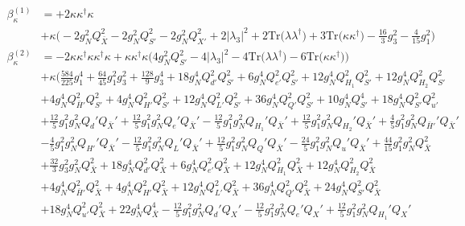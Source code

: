{\begin{align}
\beta_{\kappa}^{(1)} & =  
+2 {\kappa  \kappa^{\dagger}  \kappa} \nonumber \\ 
 &+\kappa \Big(-2 g_{N}^{2} Q_{\bar{X}}^{2}  -2 g_{N}^{2} Q_{S'}^{2}  -2 g_{N}^{2} Q_{X'}^{2}  + 2 |\lambda_3|^2  + 2 \mbox{Tr}\Big({\lambda  \lambda^{\dagger}}\Big)  + 3 \mbox{Tr}\Big({\kappa  \kappa^{\dagger}}\Big)  -\frac{16}{3} g_{3}^{2}  -\frac{4}{15} g_{1}^{2} \Big)\\ 
\beta_{\kappa}^{(2)} & =  
-2 {\kappa  \kappa^{\dagger}  \kappa  \kappa^{\dagger}  \kappa} +{\kappa  \kappa^{\dagger}  \kappa} \Big(4 g_{N}^{2} Q_{S'}^{2}  -4 |\lambda_3|^2  -4 \mbox{Tr}\Big({\lambda  \lambda^{\dagger}}\Big)  -6 \mbox{Tr}\Big({\kappa  \kappa^{\dagger}}\Big) \Big)\nonumber \\ 
 &+\kappa \Big(\frac{584}{225} g_{1}^{4} +\frac{64}{45} g_{1}^{2} g_{3}^{2} +\frac{128}{9} g_{3}^{4} +18 g_{N}^{4} Q_{d'}^{2} Q_{S'}^{2} +6 g_{N}^{4} Q_{e'}^{2} Q_{S'}^{2} +12 g_{N}^{4} Q_{H_1}^{2} Q_{S'}^{2} +12 g_{N}^{4} Q_{H_2}^{2} Q_{S'}^{2} \nonumber \\ 
 &+4 g_{N}^{4} Q_{\bar{H}'}^{2} Q_{S'}^{2} +4 g_{N}^{4} Q_{H'}^{2} Q_{S'}^{2} +12 g_{N}^{4} Q_{L'}^{2} Q_{S'}^{2} +36 g_{N}^{4} Q_{Q'}^{2} Q_{S'}^{2} +10 g_{N}^{4} Q_{S'}^{4} +18 g_{N}^{4} Q_{S'}^{2} Q_{u'}^{2} \nonumber \\ 
 &+\frac{12}{5} g_{1}^{2} g_{N}^{2} Q_d' Q_{\bar{X}}' +\frac{12}{5} g_{1}^{2} g_{N}^{2} Q_e' Q_{\bar{X}}' -\frac{12}{5} g_{1}^{2} g_{N}^{2} Q_{H_1}' Q_{\bar{X}}' +\frac{12}{5} g_{1}^{2} g_{N}^{2} Q_{H_2}' Q_{\bar{X}}' +\frac{4}{5} g_{1}^{2} g_{N}^{2} Q_{\bar{H}'}' Q_{\bar{X}}' \nonumber \\ 
 &-\frac{4}{5} g_{1}^{2} g_{N}^{2} Q_{H'}' Q_{\bar{X}}' -\frac{12}{5} g_{1}^{2} g_{N}^{2} Q_L' Q_{\bar{X}}' +\frac{12}{5} g_{1}^{2} g_{N}^{2} Q_Q' Q_{\bar{X}}' -\frac{24}{5} g_{1}^{2} g_{N}^{2} Q_u' Q_{\bar{X}}' +\frac{44}{15} g_{1}^{2} g_{N}^{2} Q_{\bar{X}}^{2} \nonumber \\ 
 &+\frac{32}{3} g_{3}^{2} g_{N}^{2} Q_{\bar{X}}^{2} +18 g_{N}^{4} Q_{d'}^{2} Q_{\bar{X}}^{2} +6 g_{N}^{4} Q_{e'}^{2} Q_{\bar{X}}^{2} +12 g_{N}^{4} Q_{H_1}^{2} Q_{\bar{X}}^{2} +12 g_{N}^{4} Q_{H_2}^{2} Q_{\bar{X}}^{2} \nonumber \\ 
 &+4 g_{N}^{4} Q_{\bar{H}'}^{2} Q_{\bar{X}}^{2} +4 g_{N}^{4} Q_{H'}^{2} Q_{\bar{X}}^{2} +12 g_{N}^{4} Q_{L'}^{2} Q_{\bar{X}}^{2} +36 g_{N}^{4} Q_{Q'}^{2} Q_{\bar{X}}^{2} +24 g_{N}^{4} Q_{S'}^{2} Q_{\bar{X}}^{2} \nonumber \\ 
 &+18 g_{N}^{4} Q_{u'}^{2} Q_{\bar{X}}^{2} +22 g_{N}^{4} Q_{\bar{X}}^{4} -\frac{12}{5} g_{1}^{2} g_{N}^{2} Q_d' Q_X' -\frac{12}{5} g_{1}^{2} g_{N}^{2} Q_e' Q_X' +\frac{12}{5} g_{1}^{2} g_{N}^{2} Q_{H_1}' Q_X' \nonumber \\ 

\end{align}}
